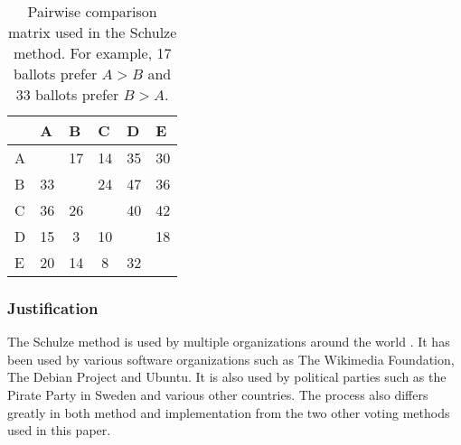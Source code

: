 \documentclass[12pt]{article}
\begin{document}
\begin{table}
\centering
\caption{Pairwise comparison matrix used in the Schulze method. For example, 17 ballots prefer $A>B$ and 33 ballots prefer $B>A$.}
\begin{tabular}{l|c|c|c|c|c|}
\cline{2-6}
 & \multicolumn{1}{l|}{A} & \multicolumn{1}{l|}{B} & \multicolumn{1}{l|}{C} & \multicolumn{1}{l|}{D} & \multicolumn{1}{l|}{E} \\ \hline
\multicolumn{1}{|l|}{A} & \cellcolor[HTML]{9B9B9B} & \cellcolor[HTML]{FFDDDD}17 & \cellcolor[HTML]{FFDDDD}14 & \cellcolor[HTML]{DDFFDD}35 & \cellcolor[HTML]{DDFFDD}30 \\ \hline
\multicolumn{1}{|l|}{B} & \cellcolor[HTML]{DDFFDD}33 & \cellcolor[HTML]{9B9B9B} & \cellcolor[HTML]{FFDDDD}24 & \cellcolor[HTML]{DDFFDD}47 & \cellcolor[HTML]{DDFFDD}36 \\ \hline
\multicolumn{1}{|l|}{C} & \cellcolor[HTML]{DDFFDD}36 & \cellcolor[HTML]{DDFFDD}26 & \cellcolor[HTML]{9B9B9B} & \cellcolor[HTML]{DDFFDD}40 & \cellcolor[HTML]{DDFFDD}42 \\ \hline
\multicolumn{1}{|l|}{D} & \cellcolor[HTML]{FFDDDD}15 & \cellcolor[HTML]{FFDDDD}3 & \cellcolor[HTML]{FFDDDD}10 & \cellcolor[HTML]{9B9B9B} & \cellcolor[HTML]{FFDDDD}18 \\ \hline
\multicolumn{1}{|l|}{E} & \cellcolor[HTML]{FFDDDD}20 & \cellcolor[HTML]{FFDDDD}14 & \cellcolor[HTML]{FFDDDD}8 & \cellcolor[HTML]{DDFFDD}32 & \cellcolor[HTML]{9B9B9B} \\ \hline
\end{tabular}
\label{tab:pairwise comparison matrix}
\end{table}
\subsubsection{Justification}
The Schulze method is used by multiple organizations around the world \autocite{wikipedia2017schulze2}. It has been used by various software organizations such as The Wikimedia Foundation, The Debian Project and Ubuntu. It is also used by political parties such as the Pirate Party in Sweden and various other countries. The process also differs greatly in both method and implementation from the two other voting methods used in this paper.
\end{document}
